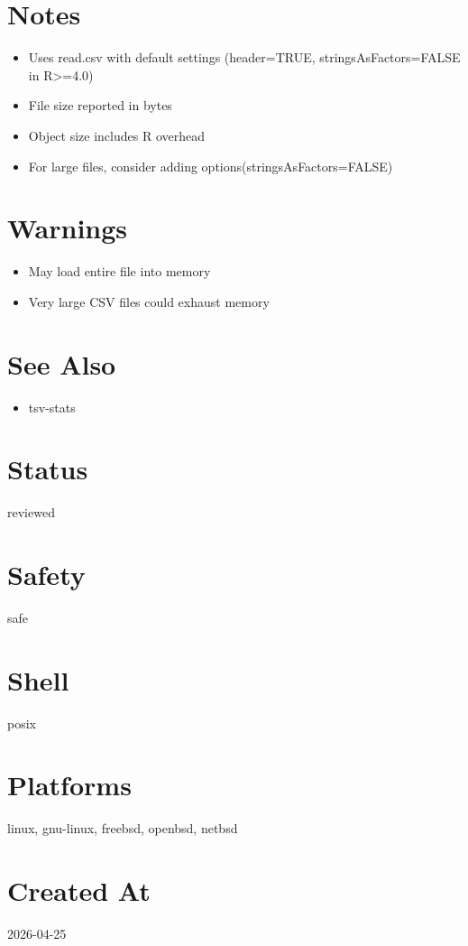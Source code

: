 \documentclass[openany]{book}
\begin{document}
\section*{Notes}
\begin{itemize}
  \item Uses read.csv with default settings (header=TRUE, stringsAsFactors=FALSE in R>=4.0)
  \item File size reported in bytes
  \item Object size includes R overhead
  \item For large files, consider adding options(stringsAsFactors=FALSE)
\end{itemize}

\section*{Warnings}
\begin{itemize}
  \item May load entire file into memory
  \item Very large CSV files could exhaust memory
\end{itemize}

\section*{See Also}
\begin{itemize}
  \item tsv-stats
\end{itemize}

\section*{Status}
reviewed

\section*{Safety}
safe

\section*{Shell}
posix

\section*{Platforms}
linux, gnu-linux, freebsd, openbsd, netbsd

\section*{Created At}
2026-04-25
\end{document}
